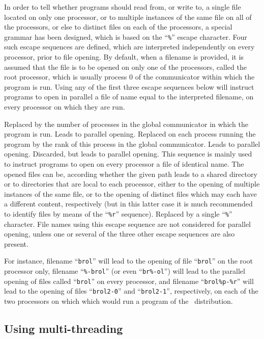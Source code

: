 In order to tell whether programs should read from, or write to, a single
file located on only one processor, or to multiple instances of the same
file on all of the processors, or else to distinct files on each of the
processors, a special grammar has been designed, which is based on the
``{\tt \%}'' escape character. Four such escape sequences are defined,
which are interpreted independently on every processor, prior to
file opening. By default, when a filename is provided, it is assumed
that the file is to be opened on only one of the processors, called
the root processor, which is usually process $0$ of the communicator
within which the program is run. Using any of the first three
escape sequences below will instruct programs to open in parallel a file
of name equal to the interpreted filename, on every processor on which they
are run.
\begin{itemize}
\iteme[{\tt \%p}]
Replaced by the number of processes in the global communicator in
which the program is run. Leads to parallel opening.
\iteme[{\tt \%r}]
Replaced on each process running the program by the rank of this
process in the global communicator. Leads to parallel opening.
\iteme[{\tt \%-}]
Discarded, but leads to parallel opening. This sequence is mainly used to
instruct programs to open on every processor a file of identical
name. The opened files can be, according whether the given path leads
to a shared directory or to directories that are local to each
processor, either to the opening of multiple instances of the same
file, or to the opening of distinct files which may each have a
different content, respectively (but in this latter case it is much
recommended to identify files by means of the ``{\tt \%r}'' sequence).
\iteme[{\tt \%\%}]
Replaced by a single ``{\tt \%}'' character. File names using this
escape sequence are not considered for parallel opening, unless one or
several of the three other escape sequences are also present.
\end{itemize}
For instance, filename ``{\tt brol}'' will lead to the
opening of file ``{\tt brol}'' on the root processor only, filename
``{\tt \%-brol}'' (or even ``{\tt br\%-ol}'') will lead to the
parallel opening of files called ``{\tt brol}'' on every processor,
and filename ``{\tt brol\%p-\%r}'' will lead to the opening of files
``{\tt brol2-0}'' and ``{\tt brol2-1}'', respectively, on each of the
two processors on which which would run a program of the
\ptscotch\ distribution.

\subsection{Using multi-threading}
\label{sec-prog-multithread}

